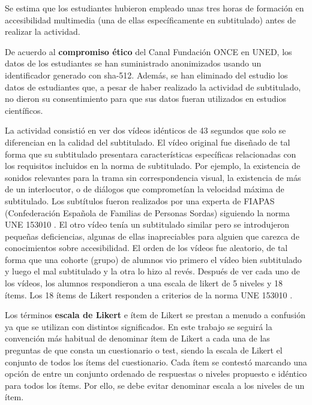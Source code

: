 \documentclass[
  12pt,
  a4paper,
  extrafontsizes,
  onecolumn,
  openright,
  table]{memoir}
\begin{document}
Se estima que los estudiantes hubieron empleado unas tres horas de
formación en accesibilidad multimedia (una de ellas específicamente en
subtitulado) antes de realizar la actividad.

De acuerdo al \textbf{compromiso ético} del Canal Fundación ONCE en
UNED, los datos de los estudiantes se han suministrado anonimizados
usando un identificador generado con \gls{sha}-512. Además, se han
eliminado del estudio los datos de estudiantes que, a pesar de haber
realizado la actividad de subtitulado, no dieron su consentimiento para
que sus datos fueran utilizados en estudios científicos.

La actividad consistió en ver dos vídeos idénticos de 43 segundos que
solo se diferencian en la calidad del subtitulado. El vídeo original fue
diseñado de tal forma que su subtitulado presentara características
específicas relacionadas con los requisitos incluidos en la norma de
subtitulado. Por ejemplo, la existencia de sonidos relevantes para la
trama sin correspondencia visual, la existencia de más de un
interlocutor, o de diálogos que comprometían la velocidad máxima de
subtitulado. Los subtítulos fueron realizados por una experta de FIAPAS
(Confederación Española de Familias de Personas Sordas) siguiendo la
norma UNE 153010 \autocite[ver][]{aenor2012}. El otro vídeo tenía un
subtitulado similar pero se introdujeron pequeñas deficiencias, algunas
de ellas inapreciables para alguien que carezca de conocimientos sobre
accesibilidad. El orden de los vídeos fue aleatorio, de tal forma que
una cohorte (grupo) de alumnos vio primero el vídeo bien subtitulado y
luego el mal subtitulado y la otra lo hizo al revés. Después de ver cada
uno de los vídeos, los alumnos respondieron a una \gls{escala de likert}
de 5 niveles y 18 ítems. Los 18 ítems de Likert responden a criterios de
la norma UNE 153010 \autocite[ver][]{aenor2012}.

Los términos \textbf{escala de Likert} e ítem de Likert se prestan a
menudo a confusión ya que se utilizan con distintos significados. En
este trabajo se seguirá la convención más habitual
\autocite[ver][]{uebersax2006} de denominar ítem de Likert a cada una de
las preguntas de que consta un cuestionario o test, siendo la escala de
Likert el conjunto de todos los ítems del cuestionario. Cada ítem se
contestó marcando una opción de entre un conjunto ordenado de respuestas
o niveles propuesto e idéntico para todos los ítems. Por ello, se debe
evitar denominar escala a los niveles de un ítem.
\end{document}
